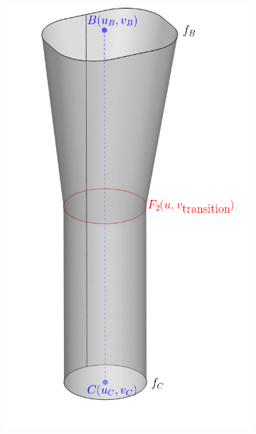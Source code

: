 \documentclass[8pt, aspectratio=169]{beamer}
\begin{document}
\begin{frame}
\begin{minipage}[t]{\textwidth}
\begin{figure}[H]
\begin{subfigure}{.25\textwidth}
				\includegraphics[width=\textwidth]{../../tec/holes/01edit.png}
			\end{subfigure}
		\end{figure}
	\end{minipage}
	\vfill
\end{frame}
\end{document}
